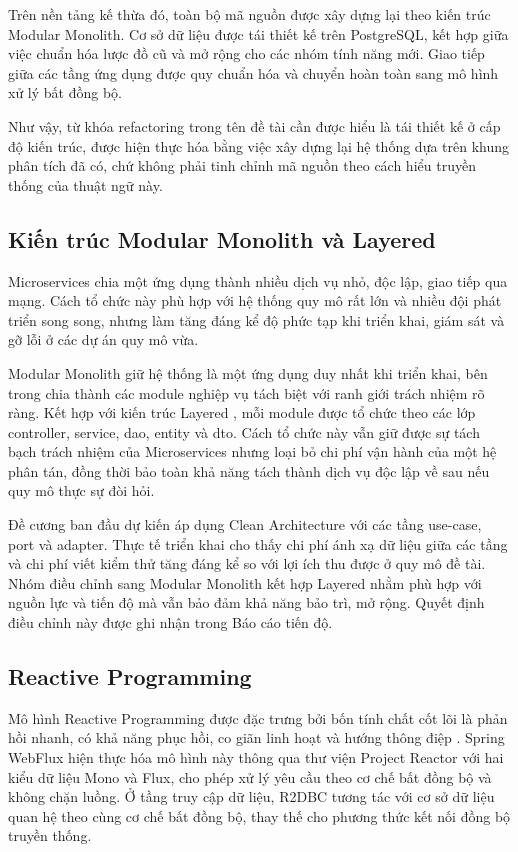 \documentclass[12pt,a4paper,oneside]{report}
\begin{document}
Trên nền tảng kế thừa đó, toàn bộ mã nguồn được xây dựng lại theo kiến trúc Modular Monolith. Cơ sở dữ liệu được tái thiết kế trên PostgreSQL, kết hợp giữa việc chuẩn hóa lược đồ cũ và mở rộng cho các nhóm tính năng mới. Giao tiếp giữa các tầng ứng dụng được quy chuẩn hóa và chuyển hoàn toàn sang mô hình xử lý bất đồng bộ.

Như vậy, từ khóa refactoring trong tên đề tài cần được hiểu là tái thiết kế ở cấp độ kiến trúc, được hiện thực hóa bằng việc xây dựng lại hệ thống dựa trên khung phân tích đã có, chứ không phải tinh chỉnh mã nguồn theo cách hiểu truyền thống của thuật ngữ này.

\subsection{Kiến trúc Modular Monolith và Layered}

Microservices \cite{microservices} chia một ứng dụng thành nhiều dịch vụ nhỏ, độc lập, giao tiếp qua mạng. Cách tổ chức này phù hợp với hệ thống quy mô rất lớn và nhiều đội phát triển song song, nhưng làm tăng đáng kể độ phức tạp khi triển khai, giám sát và gỡ lỗi ở các dự án quy mô vừa.

Modular Monolith giữ hệ thống là một ứng dụng duy nhất khi triển khai, bên trong chia thành các module nghiệp vụ tách biệt với ranh giới trách nhiệm rõ ràng. Kết hợp với kiến trúc Layered \cite{poeaa}, mỗi module được tổ chức theo các lớp controller, service, dao, entity và dto. Cách tổ chức này vẫn giữ được sự tách bạch trách nhiệm của Microservices nhưng loại bỏ chi phí vận hành của một hệ phân tán, đồng thời bảo toàn khả năng tách thành dịch vụ độc lập về sau nếu quy mô thực sự đòi hỏi.

Đề cương ban đầu dự kiến áp dụng Clean Architecture \cite{clean} với các tầng use-case, port và adapter. Thực tế triển khai cho thấy chi phí ánh xạ dữ liệu giữa các tầng và chi phí viết kiểm thử tăng đáng kể so với lợi ích thu được ở quy mô đề tài. Nhóm điều chỉnh sang Modular Monolith kết hợp Layered nhằm phù hợp với nguồn lực và tiến độ mà vẫn bảo đảm khả năng bảo trì, mở rộng. Quyết định điều chỉnh này được ghi nhận trong Báo cáo tiến độ.

\subsection{Reactive Programming}

Mô hình Reactive Programming được đặc trưng bởi bốn tính chất cốt lõi là phản hồi nhanh, có khả năng phục hồi, co giãn linh hoạt và hướng thông điệp \cite{reactive}. Spring WebFlux hiện thực hóa mô hình này thông qua thư viện Project Reactor với hai kiểu dữ liệu Mono và Flux, cho phép xử lý yêu cầu theo cơ chế bất đồng bộ và không chặn luồng. Ở tầng truy cập dữ liệu, R2DBC tương tác với cơ sở dữ liệu quan hệ theo cùng cơ chế bất đồng bộ, thay thế cho phương thức kết nối đồng bộ truyền thống.
\end{document}
